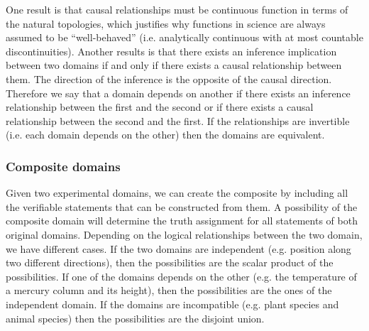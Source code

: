 \documentclass[twocolumn]{article}
\newif\ifextended
\newcommand\fact[2]{\ifextended \emph{#1}. #2 \fi}
\begin{document}
One result is that causal relationships must be continuous function in terms of the natural topologies, which justifies why functions in science are always assumed to be ``well-behaved'' (i.e. analytically continuous with at most countable discontinuities). Another results is that there exists an inference implication between two domains if and only if there exists a causal relationship between them. The direction of the inference is the opposite of the causal direction. Therefore we say that a domain depends on another if there exists an inference relationship between the first and the second or if there exists a causal relationship between the second and the first. If the relationships are invertible (i.e. each domain depends on the other) then the domains are equivalent.

\fact{Continuity and inference}{An inference relationship establishes that testing a verifiable statement in one domain tells whether a statement in the other is true or false. As these statements are equivalent, the experimental test on one constitutes an experimental test on the other, which means the second statement is verifiable. One cannot impose an inference relationship between a verifiable and non-verifiable statement. In terms of the natural topology, these correspond to open sets, therefore, by definition, the map is continuous as it maps open sets to open sets. The typical requirement that functions are ``well behaved'', then, is actually physically significant.}


\subsubsection{Composite domains}

Given two experimental domains, we can create the composite by including all the verifiable statements that can be constructed from them. A possibility of the composite domain will determine the truth assignment for all statements of both original domains. Depending on the logical relationships between the two domain, we have different cases. If the two domains are independent (e.g. position along two different directions), then the possibilities are the scalar product of the possibilities. If one of the domains depends on the other (e.g. the temperature of a mercury column and its height), then the possibilities are the ones of the independent domain. If the domains are incompatible (e.g. plant species and animal species) then the possibilities are the disjoint union.
\end{document}
